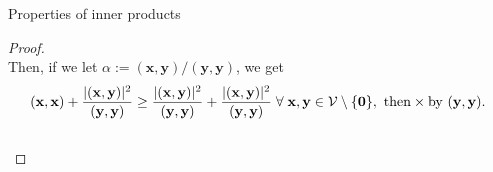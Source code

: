 \documentclass[t,usepdftitle=false]{beamer}
\begin{document}
\begin{frame}{Properties of inner products}
\begin{itemize}
\begin{proof}
\vspace{-.775cm}\\
Then, if we let $\alpha:=(\mathbf{x},\mathbf{y})/(\mathbf{y},\mathbf{y})$, we get\vspace{-.275cm}
\begin{align*}
\hspace{-.1cm}
(\mathbf{x},\mathbf{x})+\frac{|(\mathbf{x},\mathbf{y})|^2}{(\mathbf{y},\mathbf{y})}\geq
\frac{|(\mathbf{x},\mathbf{y})|^2}{(\mathbf{y},\mathbf{y})}
+\frac{|(\mathbf{x},\mathbf{y})|^2}{(\mathbf{y},\mathbf{y})}
\;\forall\; \mathbf{x},\mathbf{y}\in\mathcal{V}\setminus\{\mathbf{0}\},
\text{ then}
\times\text{by }(\mathbf{y},\mathbf{y}).
\end{align*}
\vspace{-.95cm}\\
\end{proof}
\end{itemize}
\end{frame}
\end{document}
